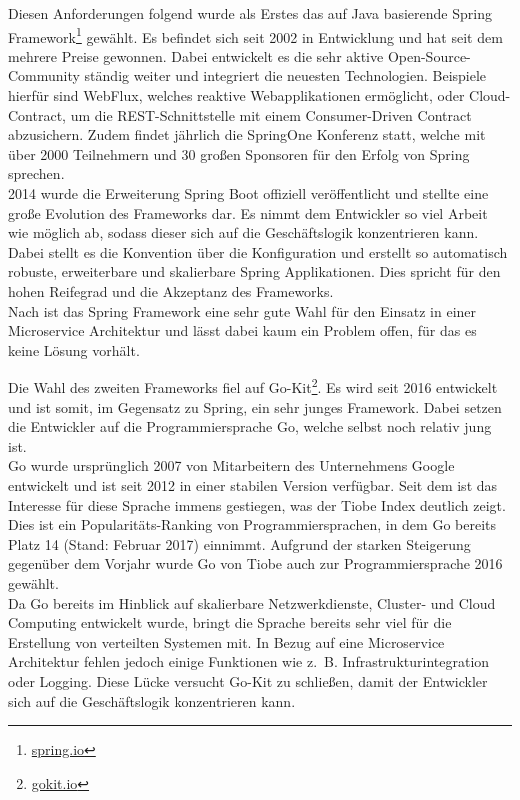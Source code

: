 Diesen Anforderungen folgend wurde als Erstes das auf Java basierende Spring Framework\footnote{\url{spring.io}} gewählt. Es befindet sich seit 2002 in Entwicklung und hat seit dem mehrere Preise gewonnen\cite[1]{Gutierrez2016}. Dabei entwickelt es die sehr aktive Open-Source-Community ständig weiter und integriert die neuesten Technologien. Beispiele hierfür sind WebFlux, welches reaktive Webapplikationen ermöglicht, oder Cloud-Contract, um die \ac{REST}-Schnittstelle mit einem Consumer-Driven Contract abzusichern. Zudem findet jährlich die SpringOne Konferenz statt, welche mit über 2000 Teilnehmern und 30 großen Sponsoren für den Erfolg von Spring sprechen\cite{SpringOne2016}.\\
2014 wurde die Erweiterung Spring Boot offiziell veröffentlicht und stellte eine große Evolution des Frameworks dar. Es nimmt dem Entwickler so viel Arbeit wie möglich ab, sodass dieser sich auf die Geschäftslogik konzentrieren kann. Dabei stellt es die Konvention über die Konfiguration und erstellt so automatisch robuste, erweiterbare und skalierbare Spring Applikationen\cite[1]{Gutierrez2016}. Dies spricht für den hohen Reifegrad und die Akzeptanz des Frameworks.\\
Nach \cite{Wolff2016} ist das Spring Framework eine sehr gute Wahl für den Einsatz in einer Microservice Architektur und lässt dabei kaum ein Problem offen, für das es keine Lösung vorhält. 

Die Wahl des zweiten Frameworks fiel auf Go-Kit\footnote{\url{gokit.io}}. Es wird seit 2016 entwickelt und ist somit, im Gegensatz zu Spring, ein sehr junges Framework. Dabei setzen die Entwickler auf die Programmiersprache Go, welche selbst noch relativ jung ist. \\
Go wurde ursprünglich 2007 von Mitarbeitern des Unternehmens Google\cite{Golang2009} entwickelt und ist seit 2012 in einer stabilen Version verfügbar. Seit dem ist das Interesse für diese Sprache immens gestiegen, was der Tiobe Index deutlich zeigt. Dies ist ein Popularitäts-Ranking von Programmiersprachen, in dem Go bereits Platz 14 (Stand: Februar 2017) einnimmt\cite{Tiobe2016}. Aufgrund der starken Steigerung gegenüber dem Vorjahr wurde Go von Tiobe auch zur Programmiersprache 2016 gewählt.\\
Da Go bereits im Hinblick auf skalierbare Netzwerkdienste, Cluster- und Cloud Computing entwickelt wurde, bringt die Sprache bereits sehr viel für die Erstellung von verteilten Systemen mit. In Bezug auf eine Microservice Architektur fehlen jedoch einige Funktionen wie z.~B. Infrastrukturintegration oder Logging. Diese Lücke versucht Go-Kit zu schließen, damit der Entwickler sich auf die Geschäftslogik konzentrieren kann.

